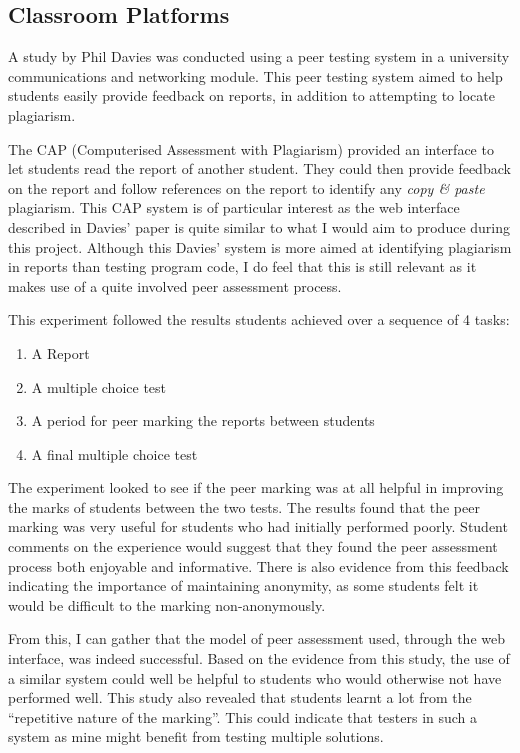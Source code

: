 \documentclass[a4paper,11pt]{report}
\begin{document}
\subsection{Classroom Platforms}
A study by Phil Davies\cite{davies_computerized_2000} was conducted using a peer testing system in a university communications and networking module. This peer testing system aimed to help students easily provide feedback on reports, in addition to attempting to locate plagiarism.\par
The CAP (Computerised Assessment with Plagiarism) provided an interface to let students read the report of another student. They could then provide feedback on the report and follow references on the report to identify any \textit{copy \& paste} plagiarism. This CAP system is of particular interest as the web interface described in Davies' paper is quite similar to what I would aim to produce during this project. Although this Davies' system is more aimed at identifying plagiarism in reports than testing program code, I do feel that this is still relevant as it makes use of a quite involved peer assessment process.\par
This experiment followed the results students achieved over a sequence of 4 tasks:
\begin{enumerate}
\item A Report
\item A multiple choice test
\item A period for peer marking the reports between students
\item A final multiple choice test
\end{enumerate}
The experiment looked to see if the peer marking was at all helpful in improving the marks of students between the two tests. The results found that the peer marking was very useful for students who had initially performed poorly. Student comments on the experience would suggest that they found the peer assessment process both enjoyable and informative. There is also evidence from this feedback indicating the importance of maintaining anonymity, as some students felt it would be difficult to the marking non-anonymously.\par
From this, I can gather that the model of peer assessment used, through the web interface, was indeed successful. Based on the evidence from this study, the use of a similar system could well be helpful to students who would otherwise not have performed well. This study also revealed that students learnt a lot from the ``repetitive nature of the marking''. This could indicate that testers in such a system as mine might benefit from testing multiple solutions.\par
\end{document}
